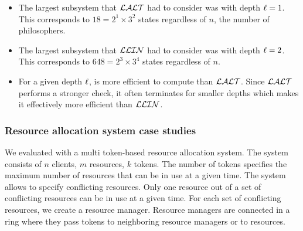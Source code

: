 \begin{itemize}
\item The largest subsystem that $\mathcal{LALT}$ had to consider was with depth $\ell=1$. This corresponds to $18 = 2^1\times 3^2$ states regardless of $n$, the number of philosophers. 
\item The largest subsystem that $\mathcal{LLIN}$ had to consider was with depth $\ell=2$. This corresponds to $648 = 2^3 \times 3^4$ states regardless of $n$. 
\item For a given depth $\ell$, \LLin is more efficient to compute than $\mathcal{LALT}$. 
 Since $\mathcal{LALT}$ performs a stronger check, it often terminates for smaller depths which makes it effectively more efficient than $\mathcal{LLIN}$. 
\end{itemize}


\begin{table}
\label{bench:dining}
\end{table}



\subsubsection{Resource allocation system case studies}

We evaluated \deadlocktool{} with a multi token-based resource allocation system. 
The system consists of $n$ clients, $m$ resources, $k$ tokens. 
The number of tokens specifies the maximum number of resources that
can be in use at a given time. 
The system allows to specify conflicting resources. 
Only one resource out of a set of conflicting resources can be in use at a given time.
For each set of conflicting resources, we create a resource manager.
Resource managers are connected in a ring where they pass tokens to neighboring resource managers or to resources. 

